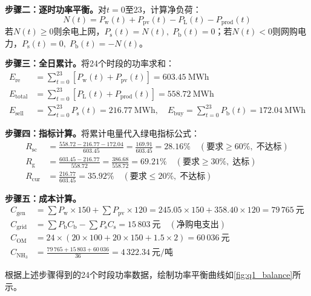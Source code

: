 \textbf{步骤二：逐时功率平衡。}对$t=0$至23，计算净负荷：
\begin{equation*}
N(t) = P_{\mathrm{w}}(t) + P_{\mathrm{pv}}(t) - P_{\mathrm{L}}(t) - P_{\mathrm{prod}}(t)
\end{equation*}
若$N(t)\ge 0$则余电上网，$P_{\mathrm{s}}(t)=N(t),\;P_{\mathrm{b}}(t)=0$；若$N(t)<0$则网购电力，$P_{\mathrm{s}}(t)=0,\;P_{\mathrm{b}}(t)=-N(t)$。

\textbf{步骤三：全日累计。}将24个时段的功率求和：
\begin{align*}
E_{\mathrm{re}} &= \sum_{t=0}^{23}[P_{\mathrm{w}}(t)+P_{\mathrm{pv}}(t)] = 603.45\ \text{MWh}\\
E_{\mathrm{total}} &= \sum_{t=0}^{23}[P_{\mathrm{L}}(t)+P_{\mathrm{prod}}(t)] = 558.72\ \text{MWh}\\
E_{\mathrm{sell}} &= \sum_{t=0}^{23}P_{\mathrm{s}}(t) = 216.77\ \text{MWh},\quad
E_{\mathrm{buy}} = \sum_{t=0}^{23}P_{\mathrm{b}}(t) = 172.04\ \text{MWh}
\end{align*}

\textbf{步骤四：指标计算。}将累计电量代入绿电指标公式：
\begin{align*}
R_{\mathrm{sc}} &= \frac{558.72 - 216.77 - 172.04}{603.45} = \frac{169.91}{603.45} = 28.16\% \quad (\text{要求}\ge 60\%,\; \text{不达标})\\
R_{\mathrm{g}} &= \frac{603.45 - 216.77}{558.72} = \frac{386.68}{558.72} = 69.21\% \quad (\text{要求}\ge 30\%,\; \text{达标})\\
R_{\mathrm{cur}} &= \frac{216.77}{603.45} = 35.92\% \quad (\text{要求}\le 20\%,\; \text{不达标})
\end{align*}

\textbf{步骤五：成本计算。}
\begin{align*}
C_{\mathrm{gen}} &= \sum P_{\mathrm{w}}\times 150 + \sum P_{\mathrm{pv}}\times 120 = 245.05\times 150 + 358.40\times 120 = 79\,765\ \text{元}\\
C_{\mathrm{grid}} &= \sum P_{\mathrm{b}}C_{\mathrm{b}} - \sum P_{\mathrm{s}}C_{\mathrm{s}} = 15\,803\ \text{元} \quad (\text{净购电支出})\\
C_{\mathrm{OM}} &= 24\times (20\times 100 + 20\times 150 + 1.5\times 2) = 60\,036\ \text{元}\\
C_{\mathrm{NH_3}} &= \frac{79\,765 + 15\,803 + 60\,036}{36} = 4\,322.34\ \text{元/吨}
\end{align*}

根据上述步骤得到的24个时段功率数据，绘制功率平衡曲线如\cref{fig:q1_balance}所示。

